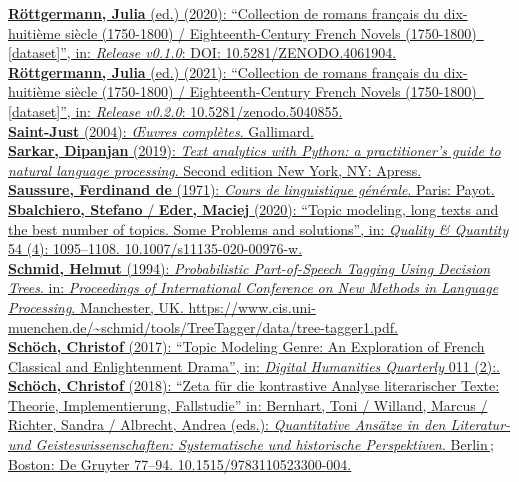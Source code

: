 \documentclass[
  12pt,
  letterpaper,
  DIV=11,
  numbers=noendperiod]{scrreprt}
\begin{document}
\href{https://www.zotero.org/google-docs/?fqBRoB}{\textbf{Röttgermann,
Julia} (ed.) (2020): ``Collection de romans français du dix-huitième
siècle (1750-1800) / Eighteenth-Century French Novels (1750-1800)~
{[}dataset{]}'', in: \emph{Release v0.1.0}: DOI:
10.5281/ZENODO.4061904.}\\
\href{https://www.zotero.org/google-docs/?fqBRoB}{\textbf{Röttgermann,
Julia} (ed.) (2021): ``Collection de romans français du dix-huitième
siècle (1750-1800) / Eighteenth-Century French Novels (1750-1800)~
{[}dataset{]}'', in: \emph{Release v0.2.0}: 10.5281/zenodo.5040855.}\\
\href{https://www.zotero.org/google-docs/?fqBRoB}{\textbf{Saint-Just}
(2004): \emph{Œuvres complètes}. Gallimard.}\\
\href{https://www.zotero.org/google-docs/?fqBRoB}{\textbf{Sarkar,
Dipanjan} (2019): \emph{Text analytics with Python: a practitioner's
guide to natural language processing}. Second edition New York, NY:
Apress.}\\
\href{https://www.zotero.org/google-docs/?fqBRoB}{\textbf{Saussure,
Ferdinand de} (1971): \emph{Cours de linguistique générale}. Paris:
Payot.}\\
\href{https://www.zotero.org/google-docs/?fqBRoB}{\textbf{Sbalchiero,
Stefano} / \textbf{Eder, Maciej} (2020): ``Topic modeling, long texts
and the best number of topics. Some Problems and solutions'', in:
\emph{Quality \& Quantity} 54 (4): 1095--1108.
10.1007/s11135-020-00976-w.}\\
\href{https://www.zotero.org/google-docs/?fqBRoB}{\textbf{Schmid,
Helmut} (1994): \emph{Probabilistic Part-of-Speech Tagging Using
Decision Trees}. in: \emph{Proceedings of International Conference on
New Methods in Language Processing}. Manchester, UK.
https://www.cis.uni-muenchen.de/\textasciitilde schmid/tools/TreeTagger/data/tree-tagger1.pdf.}\\
\href{https://www.zotero.org/google-docs/?fqBRoB}{\textbf{Schöch,
Christof} (2017): ``Topic Modeling Genre: An Exploration of French
Classical and Enlightenment Drama'', in: \emph{Digital Humanities
Quarterly} 011 (2):.}\\
\href{https://www.zotero.org/google-docs/?fqBRoB}{\textbf{Schöch,
Christof} (2018): ``Zeta für die kontrastive Analyse literarischer
Texte: Theorie, Implementierung, Fallstudie'' in: Bernhart, Toni /
Willand, Marcus / Richter, Sandra / Albrecht, Andrea (eds.):
\emph{Quantitative Ansätze in den Literatur- und Geisteswissenschaften:
Systematische und historische Perspektiven}. Berlin\,; Boston: De
Gruyter 77--94. 10.1515/9783110523300-004.}\\
\end{document}
